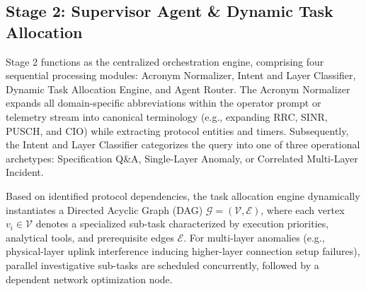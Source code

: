 \documentclass[conference]{IEEEtran}
\begin{document}
\subsection{Stage 2: Supervisor Agent \& Dynamic Task Allocation}
Stage 2 functions as the centralized orchestration engine, comprising four sequential processing modules: Acronym Normalizer, Intent and Layer Classifier, Dynamic Task Allocation Engine, and Agent Router. The Acronym Normalizer expands all domain-specific abbreviations within the operator prompt or telemetry stream into canonical terminology (e.g., expanding RRC, SINR, PUSCH, and CIO) while extracting protocol entities and timers. Subsequently, the Intent and Layer Classifier categorizes the query into one of three operational archetypes: Specification Q\&A, Single-Layer Anomaly, or Correlated Multi-Layer Incident.

Based on identified protocol dependencies, the task allocation engine dynamically instantiates a Directed Acyclic Graph (DAG) $\mathcal{G} = (\mathcal{V}, \mathcal{E})$, where each vertex $v_i \in \mathcal{V}$ denotes a specialized sub-task characterized by execution priorities, analytical tools, and prerequisite edges $\mathcal{E}$. For multi-layer anomalies (e.g., physical-layer uplink interference inducing higher-layer connection setup failures), parallel investigative sub-tasks are scheduled concurrently, followed by a dependent network optimization node.
\end{document}
